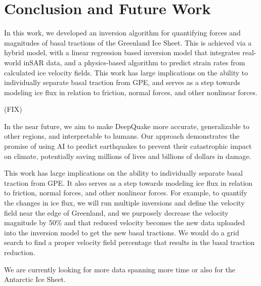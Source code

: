 \documentclass{article}
\begin{document}
\section{Conclusion and Future Work}

In this work, we developed an inversion algorithm for quantifying forces and magnitudes of basal tractions of the Greenland Ice Sheet. This is achieved via a hybrid model, with a linear regression based inversion model that integrates real-world inSAR data, and a physics-based algorithm to predict strain rates from calculated ice velocity fields. This work has large implications on the ability to individually separate basal traction from GPE, and serves as a step towards modeling ice flux in relation to friction, normal forces, and other nonlinear forces.

(FIX)

In the near future, we aim to make DeepQuake more accurate, generalizable to other regions, and interpretable to
humans. Our approach demonstrates the promise of using AI to predict earthquakes to prevent their
catastrophic impact on climate, potentially saving millions of lives and billions of dollars in damage.

\cite{briner_rate_2020}

This work has large implications on the ability to individually separate basal traction from GPE. It also serves as a step towards modeling ice flux in relation to friction, normal forces, and other nonlinear forces. For example, to quantify the changes in ice flux, we will run multiple inversions and define the velocity field near the edge of Greenland, and we purposely decrease the velocity magnitude by 50\% and that reduced velocity becomes the new data uploaded into the inversion model to get the new basal tractions. We would do a grid search to find a proper velocity field percentage that results in the basal traction reduction.

We are currently looking for more data spanning more time or also for the Antarctic Ice Sheet.


\small


\end{document}

